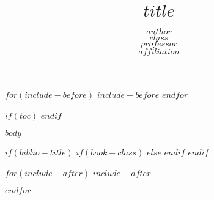 \documentclass[a4paper,11pt]{article}
\title{$title$}
\author{$author$ \\ {\small  $class$} \\ {\small $professor$} \\ {\small $affiliation$}}
\begin{document}
\pagestyle{plain}

\maketitle

$for(include-before)$
$include-before$
$endfor$


$if(toc)$
{
\clearpage
\hypersetup{linkcolor=black}
\setcounter{tocdepth}{$toc-depth$}
\tableofcontents
\clearpage
}
$endif$

$body$

$if(biblio-title)$
$if(book-class)$
\renewcommand\bibname{$biblio-title$}
$else$
\renewcommand\refname{$biblio-title$}
$endif$
$endif$



$for(include-after)$
$include-after$

$endfor$
\end{document}
